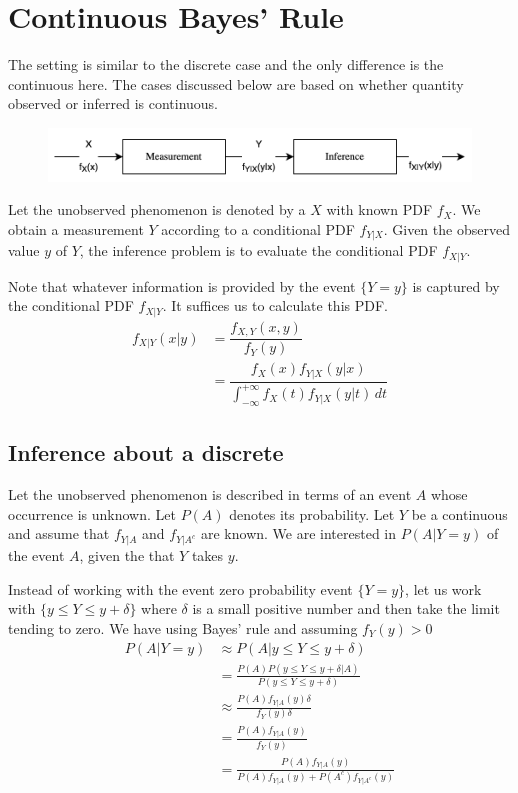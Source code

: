 \section{Continuous Bayes' Rule}
The setting is similar to the discrete case and the only difference is the continuous \rv here. The cases discussed below are based on whether quantity observed or inferred is continuous.

\begin{figure}[h]
    \center
    \includegraphics[width=.8\textwidth]{images/P_bayes rule.png}
 \end{figure}

Let the unobserved phenomenon is denoted by a \rv $X$ with known PDF $f_X$. We obtain a measurement $Y$ according to a conditional PDF $f_{Y|X}$. Given the observed value $y$ of $Y$, the inference problem is to evaluate the conditional PDF $f_{X|Y}$.

Note that whatever information is provided by the event $\{Y=y\}$ is captured by the conditional PDF $f_{X|Y}$. It suffices us to calculate this PDF.
\begin{align*}
    f_{X|Y}(x|y) &= \dfrac{f_{X,Y}(x, y)}{f_Y(y)} \\
                &= \dfrac{f_X(x)f_{Y|X}(y|x)}{\int_{-\infty}^{+\infty}f_X(t)f_{Y|X}(y|t) \, dt}
\end{align*}

\subsection{Inference about a discrete \rv}
Let the unobserved phenomenon is described in terms of an event $A$ whose occurrence is unknown. Let $P(A)$ denotes its probability. Let $Y$ be a continuous \rv and assume that $f_{Y|A}$ and $f_{Y|A^c}$ are known. We are interested in $P(A|Y=y)$ of the event $A$, given the that $Y$ takes $y$.

Instead of working with the event zero probability event $\{Y=y\}$, let us work with $\{y \le Y \le y+\delta\}$ where $\delta$ is a small positive number and then take the limit tending to zero. We have using Bayes' rule and assuming $f_Y(y)>0$
\begin{align*}
    P(A|Y=y) & \approx P(A|y \le Y \le y+\delta) \\
             &= \frac{P(A)P(y \le Y \le y+\delta|A)}{P(y \le Y \le y+\delta)} \\
             & \approx \frac{P(A)f_{Y|A}(y)\delta}{f_Y(y)\delta} \\
             &= \frac{P(A)f_{Y|A}(y)}{f_Y(y)}\\
             &= \frac{P(A)f_{Y|A}(y)}{P(A)f_{Y|A}(y)+P(A^c)f_{Y|A^c}(y)}
\end{align*}

